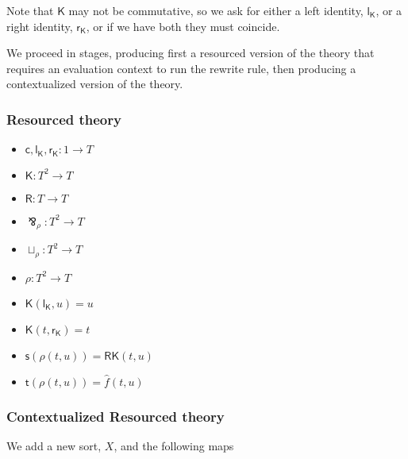 \documentclass{llncs}
\renewcommand{\:}{\colon}
\begin{document}
Note that $\mathsf{K}$ may not be commutative, so we ask for either a left
identity, $\mathsf{l}_{\mathsf{K}}$, or a right identity, $\mathsf{r}_{\mathsf{K}}$, or if we have both they must
coincide.

We proceed in stages, producing first a resourced version of the
theory that requires an evaluation context to run the rewrite rule,
then producing a contextualized version of the theory.

\subsubsection{Resourced theory}


\begin{itemize}
  \item $\mathsf{c}, \mathsf{l}_{\mathsf{K}}, \mathsf{r}_{\mathsf{K}} : 1 \rightarrow T$
  \item $\mathsf{K} : T^{2} \rightarrow T$
  \item $\mathsf{R} : T \rightarrow T$
  \item $\bindnasrepma_{\rho} : T^{2} \rightarrow T$
  \item $\sqcup_{\rho} : T^{2} \rightarrow T$
  \item $\rho : T^{2} \rightarrow T$             %
  \item $\mathsf{K}(\mathsf{l}_{\mathsf{K}}, u) = u$
  \item $\mathsf{K}(t, \mathsf{r}_{\mathsf{K}}) = t$
  \item $\mathsf{s}(\rho(t,u)) = \mathsf{R}\mathsf{K}(t, u)$
  \item $\mathsf{t}(\rho(t,u)) = \hat{f}(t,u)$                    %
\end{itemize}

\subsubsection{Contextualized Resourced theory}
We add a new sort, $X$, and the following maps

\end{document}
